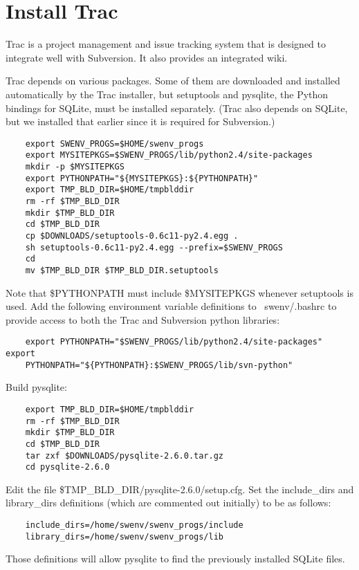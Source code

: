 
\section{Install Trac}


Trac is a project management and issue tracking system that is designed
to integrate well with Subversion.  It also provides an integrated wiki.

Trac depends on various packages.  Some of them are downloaded and
installed automatically by the Trac installer, but setuptools and
pysqlite, the Python bindings for SQLite, must be installed separately.
(Trac also depends on SQLite, but we installed that earlier since it is
required for Subversion.)

\begin{verbatim}
    export SWENV_PROGS=$HOME/swenv_progs
    export MYSITEPKGS=$SWENV_PROGS/lib/python2.4/site-packages
    mkdir -p $MYSITEPKGS
    export PYTHONPATH="${MYSITEPKGS}:${PYTHONPATH}"
    export TMP_BLD_DIR=$HOME/tmpblddir
    rm -rf $TMP_BLD_DIR
    mkdir $TMP_BLD_DIR
    cd $TMP_BLD_DIR
    cp $DOWNLOADS/setuptools-0.6c11-py2.4.egg .
    sh setuptools-0.6c11-py2.4.egg --prefix=$SWENV_PROGS
    cd
    mv $TMP_BLD_DIR $TMP_BLD_DIR.setuptools
\end{verbatim}

Note that \$PYTHONPATH must include \$MYSITEPKGS whenever setuptools
is used.  Add the following environment variable definitions to
~swenv/.bashrc to provide access to both the Trac and Subversion python
libraries:
\begin{verbatim}
    export PYTHONPATH="$SWENV_PROGS/lib/python2.4/site-packages" export
    PYTHONPATH="${PYTHONPATH}:$SWENV_PROGS/lib/svn-python"
\end{verbatim}

Build pysqlite:

\begin{verbatim}
    export TMP_BLD_DIR=$HOME/tmpblddir
    rm -rf $TMP_BLD_DIR
    mkdir $TMP_BLD_DIR
    cd $TMP_BLD_DIR
    tar zxf $DOWNLOADS/pysqlite-2.6.0.tar.gz
    cd pysqlite-2.6.0
\end{verbatim}

Edit the file \$TMP\_BLD\_DIR/pysqlite-2.6.0/setup.cfg.  Set the 
include\_dirs
and library\_dirs definitions (which are commented out initially) to be
as follows:
\begin{verbatim}
    include_dirs=/home/swenv/swenv_progs/include
    library_dirs=/home/swenv/swenv_progs/lib
\end{verbatim}
Those definitions will allow pysqlite to find the previously installed
SQLite files.

